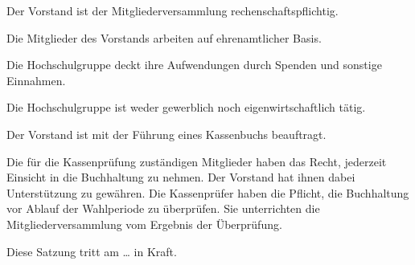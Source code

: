 \documentclass[a4paper, parskip=half, numbers=noenddot]{scrartcl}
\begin{document}
\begin{contract}
Der Vorstand ist der Mitgliederversammlung rechenschaftspflichtig.

Die Mitglieder des Vorstands arbeiten auf ehrenamtlicher Basis.


%
%


Die Hochschulgruppe deckt ihre Aufwendungen durch Spenden und sonstige
Einnahmen.

Die Hochschulgruppe ist weder gewerblich noch eigenwirtschaftlich tätig.

Der Vorstand ist mit der Führung eines Kassenbuchs beauftragt.

Die für die Kassenprüfung zuständigen Mitglieder haben das Recht, jederzeit
Einsicht in die Buchhaltung zu nehmen.
Der Vorstand hat ihnen dabei Unterstützung zu gewähren.
Die Kassenprüfer haben die Pflicht, die Buchhaltung vor Ablauf der Wahlperiode
zu überprüfen.
Sie unterrichten die Mitgliederversammlung vom Ergebnis der Überprüfung.


%
%


Diese Satzung tritt am \dots{} in Kraft.

\end{contract}
\end{document}
